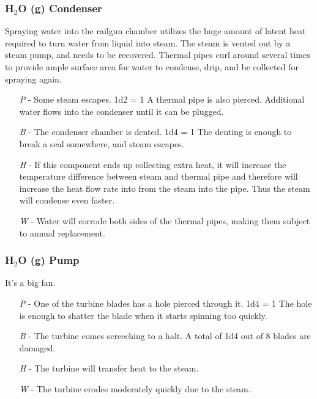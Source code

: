 \documentclass[a4paper]{article}
\begin{document}
\vspace{-0.5cm} \hspace{-18pt} \subsubsection{H$_2$O (g) Condenser} \label{railgun_h2o_condenser} \vspace{-0.2cm}
Spraying water into the railgun chamber utilizes the huge amount of latent heat required to turn water from liquid into steam. The steam is vented out by a steam pump, and needs to be recovered. Thermal pipes curl around several times to provide ample surface area for water to condense, drip, and be collected for spraying again.
\begin{enumerate}
\item [\textit{P}] - Some steam escapes. \newline \hspace*{3pt} 1d2 = 1 A thermal pipe is also pierced. Additional water flows into the condenser until it can be plugged.
\item [\textit{B}] - The condenser chamber is dented. \newline \hspace*{3pt} 1d4 = 1 The denting is enough to break a seal somewhere, and steam escapes.
\item [\textit{H}] - If this component ends up collecting extra heat, it will increase the temperature difference between steam and thermal pipe and therefore will increase the heat flow rate into from the steam into the pipe. Thus the steam will condense even faster.
\item [\textit{W}] - Water will corrode both sides of the thermal pipes, making them subject to annual replacement.
\end{enumerate}

\vspace{-0.5cm} \hspace{-18pt} \subsubsection{H$_2$O (g) Pump} \label{railgun_h2o_g_pump} \vspace{-0.2cm}
It's a big fan.
\begin{enumerate}
\item [\textit{P}] - One of the turbine blades has a hole pierced through it. \newline \hspace*{3pt} 1d4 = 1 The hole is enough to shatter the blade when it starts spinning too quickly. 
\item [\textit{B}] - The turbine comes screeching to a halt. A total of 1d4 out of 8 blades are damaged.
\item [\textit{H}] - The turbine will transfer heat to the steam. 
\item [\textit{W}] - The turbine erodes moderately quickly due to the steam.
\end{enumerate}
\end{document}
